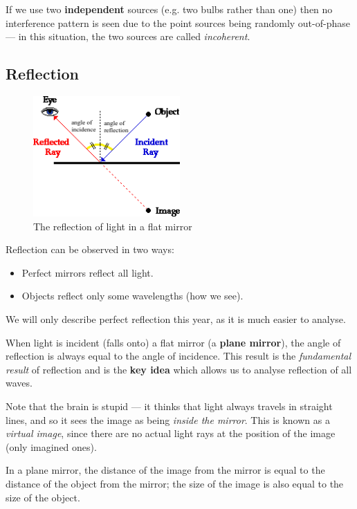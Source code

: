 \documentclass[a4paper]{amsbook}
\newcommand\capcite[1]{}
\begin{document}
If we use two \textbf{independent} sources (e.g. two bulbs rather than one) then no interference pattern is seen due to the point
sources being randomly out-of-phase --- in this situation, the two sources are called \textit{incoherent}.

\subsection{Reflection}
\begin{figure}
  \centering
  \includegraphics[width=0.5\textwidth]{reflection}
  \caption{The reflection of light in a flat mirror \capcite{http://www.physicsclassroom.com/Class/refln/u13l1c2.gif}\label{fig:reflection}}
\end{figure}
Reflection can be observed in two ways:
\begin{itemize}
  \item Perfect mirrors reflect all light.
  \item Objects reflect only some wavelengths (how we see).
\end{itemize}
We will only describe perfect reflection this year, as it is much easier to analyse.

When light is incident (falls onto) a flat mirror (a \textbf{plane mirror}), the angle of reflection is always equal to the angle
of incidence. This result is the \textit{fundamental result} of reflection and is the \textbf{key idea} which allows us to analyse
reflection of all waves.

Note that the brain is stupid --- it thinks that light always travels in straight lines, and so it sees the image as
being \textit{inside the mirror}. This is known as a \textit{virtual image}, since there are no actual light rays at
the position of the image (only imagined ones).

In a plane mirror, the distance of the image from the mirror is equal to the distance of the object from the mirror; the size
of the image is also equal to the size of the object.
\end{document}

